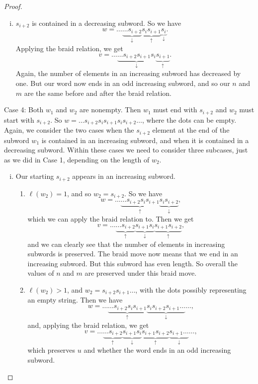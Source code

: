 \documentclass[11pt]{article}
\begin{document}
\begin{proof}
\begin{enumerate}[(i)]
    \item $s_{i+2}$ is contained in a decreasing subword. So we have 
    \[w=\hdots\underbrace{\hdots s_{i+2}}_\downarrow \underbrace{s_is_{i+1}}_\uparrow \underbrace{s_i}_\downarrow.\] 
    Applying the braid relation, we get
    \[v=\hdots\underbrace{\hdots s_{i+2}s_{i+1}s_i}_\downarrow \underbrace{s_{i+1}}_\uparrow.\]
    Again, the number of elements in an increasing subword has decreased by one. But our word now ends in an odd increasing subword, and so our $n$ and $m$ are the same before and after the braid relation.
    \end{enumerate}


    Case 4: Both $w_1$ and $w_2$ are nonempty. Then $w_1$ must end with $s_{i+2}$ and $w_2$ must start with $s_{i+2}$. So $w=\hdots s_{i+2}s_is_{i+1}s_is_{i+2}\hdots$, where the dots can be empty. Again, we consider the two cases when the $s_{i+2}$ element at the end of the subword $w_1$ is contained in an increasing subword, and when it is contained in a decreasing subword. Within these cases we need to consider three subcases, just as we did in Case 1, depending on the length of $w_2$. 

    
    \begin{enumerate}[(i)]
        \item Our starting $s_{i+2}$ appears in an increasing subword.
        \begin{enumerate}
        \item $\ell(w_2)=1$, and so $w_2=s_{i+2}$. So we have
        \[w=\hdots\underbrace{\hdots s_{i+2}s_is_{i+1}}_\uparrow\underbrace{s_is_{i+2}}_\downarrow,\]
        which we can apply the braid relation to. Then we get
        \[v=\hdots\underbrace{\hdots s_{i+2}}_\uparrow\underbrace{s_{i+1}s_i}_\downarrow\underbrace{s_{i+1}s_{i+2}}_\uparrow,\]
        and we can clearly see that the number of elements in increasing subwords is preserved. The braid move now means that we end in an increasing subword. But this subword has even length. So overall the values of $n$ and $m$ are preserved under this braid move.

        \item $\ell(w_2)>1$, and $w_2=s_{i+2}s_{i+1}\hdots$, with the dots possibly representing an empty string. Then we have 
        \[w=\hdots\underbrace{\hdots s_{i+2}s_is_{i+1}}_\uparrow\underbrace{s_is_{i+2}s_{i+1}\hdots}_\downarrow\hdots,\]
        and, applying the braid relation, we get
        \[v=\hdots\underbrace{\hdots s_{i+2}}_\uparrow\underbrace{s_{i+1}s_i}_\downarrow\underbrace{s_{i+1}s_{i+2}}_\uparrow\underbrace{s_{i+1}\hdots}_\downarrow\hdots,\]
        which preserves $u$ and whether the word ends in an odd increasing subword. 


\end{enumerate}
\end{enumerate}
\end{proof}
\end{document}
